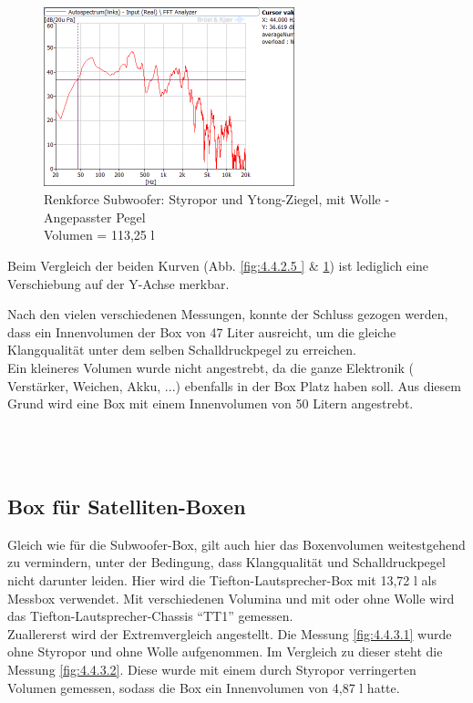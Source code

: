 \begin{figure} [H]
\centering
\includegraphics[width=0.65\textwidth]{img/Optimierung/Sub/RenkforceStyro_113l_Wolle_Angepasst.png}
\caption{Renkforce Subwoofer: Styropor und Ytong-Ziegel, mit Wolle - Angepasster Pegel \\Volumen = 113,25 l}
\label{fig:4.4.2.6}
\end{figure}
Beim Vergleich der beiden Kurven (Abb. \ref{fig:4.4.2.5 } \& \ref{fig:4.4.2.6}) ist lediglich eine Verschiebung auf der Y-Achse merkbar.

\newpage
Nach den vielen verschiedenen Messungen, konnte der Schluss gezogen werden, dass ein Innenvolumen der Box von 47 Liter ausreicht, um die gleiche Klangqualität unter dem selben Schalldruckpegel zu erreichen.\\
Ein kleineres Volumen wurde nicht angestrebt, da die ganze Elektronik ( Verstärker, Weichen, Akku, ...) ebenfalls in der Box Platz haben soll.
Aus diesem Grund wird eine Box mit einem Innenvolumen von 50 Litern angestrebt.\\ \\ \\ \\




\subsection{Box für Satelliten-Boxen}\label{subsec:4.4.3}
Gleich wie für die Subwoofer-Box, gilt auch hier das Boxenvolumen weitestgehend zu vermindern, unter der Bedingung, dass Klangqualität und Schalldruckpegel nicht darunter leiden.
Hier wird die Tiefton-Lautsprecher-Box mit 13,72 l als Messbox verwendet.
Mit verschiedenen Volumina und mit oder ohne Wolle wird das Tiefton-Lautsprecher-Chassis \enquote{TT1} gemessen.\\
Zuallererst wird der Extremvergleich angestellt.
Die Messung \ref{fig:4.4.3.1} wurde ohne Styropor und ohne Wolle aufgenommen.
Im Vergleich zu dieser steht die Messung \ref{fig:4.4.3.2}.
Diese wurde mit einem durch Styropor verringerten Volumen gemessen, sodass die Box ein Innenvolumen von 4,87 l hatte.

